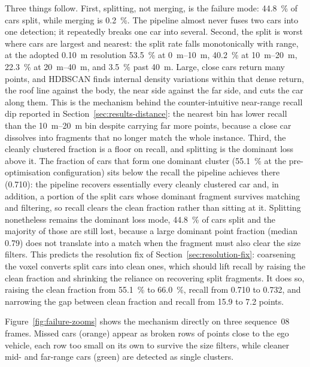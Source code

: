 Three things follow. First, splitting, not merging, is the failure mode:
\SI{44.8}{\percent} of cars split, while merging is \SI{0.2}{\percent}. The pipeline
almost never fuses two cars into one detection; it
repeatedly breaks one car into several. Second, the split is worst where
cars are largest and nearest: the split rate falls monotonically with range, at the
adopted \SI{0.10}{\metre} resolution \SI{53.5}{\percent} at \SIrange{0}{10}{\metre},
\SI{40.2}{\percent} at \SIrange{10}{20}{\metre}, \SI{22.3}{\percent} at
\SIrange{20}{40}{\metre}, and \SI{3.5}{\percent} past \SI{40}{\metre}. Large, close
cars return many points, and
HDBSCAN finds internal density variations within that dense return, the roof line
against the body, the near side against the far side, and cuts the car along
them. This is the mechanism behind the counter-intuitive near-range recall dip
reported in Section~\ref{sec:results-distance}: the nearest bin has lower recall than
the \SIrange{10}{20}{\metre} bin despite carrying far more points, because a close
car dissolves into fragments that no longer match the whole instance. Third,
the cleanly clustered fraction is a floor on recall, and splitting is the dominant
loss above it. The fraction of cars that form one dominant cluster
(\SI{55.1}{\percent} at the pre-optimisation configuration) sits below the recall the
pipeline achieves there (\num{0.710}): the pipeline recovers essentially every
cleanly clustered car and, in addition, a portion of the split cars whose dominant
fragment survives matching and filtering, so recall clears the clean fraction rather
than sitting at it. Splitting nonetheless remains the dominant loss mode,
\SI{44.8}{\percent} of cars split and the majority of those are still lost, because
a large dominant point fraction (median \num{0.79}) does not translate into a match
when the fragment must also clear the size filters. This predicts the resolution fix
of Section~\ref{sec:resolution-fix}: coarsening the voxel converts split cars into
clean ones, which should lift recall by raising the clean fraction and shrinking the
reliance on recovering split fragments. It does so, raising the clean fraction from
\SI{55.1}{\percent} to \SI{66.0}{\percent}, recall from \num{0.710} to
\num{0.732}, and narrowing the gap between clean fraction and recall from \num{15.9}
to \num{7.2} points.

Figure~\ref{fig:failure-zooms} shows the mechanism directly on three sequence~08
frames. Missed cars (orange) appear as broken rows of points close to the ego
vehicle, each row too small on its own to survive the size filters, while cleaner
mid- and far-range cars (green) are detected as single clusters.

